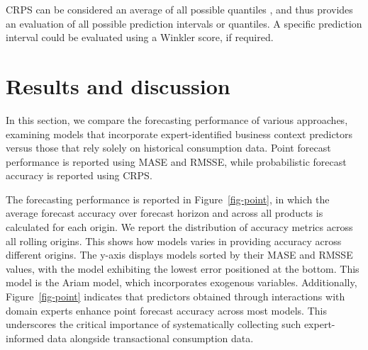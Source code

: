 \documentclass[
  authoryear,
  preprint,
  3p]{elsarticle}
\begin{document}
CRPS can be considered an average of all possible quantiles
\citep[Section 5.9]{hyndman2021forecasting}, and thus provides an
evaluation of all possible prediction intervals or quantiles. A specific
prediction interval could be evaluated using a Winkler score, if
required.

\section{Results and discussion}\label{sec-results}

In this section, we compare the forecasting performance of various
approaches, examining models that incorporate expert-identified business
context predictors versus those that rely solely on historical
consumption data. Point forecast performance is reported using MASE and
RMSSE, while probabilistic forecast accuracy is reported using CRPS.

The forecasting performance is reported in Figure~\ref{fig-point}, in
which the average forecast accuracy over forecast horizon and across all
products is calculated for each origin. We report the distribution of
accuracy metrics across all rolling origins. This shows how models
varies in providing accuracy across different origins. The y-axis
displays models sorted by their MASE and RMSSE values, with the model
exhibiting the lowest error positioned at the bottom. This model is the
Ariam model, which incorporates exogenous variables. Additionally,
Figure~\ref{fig-point} indicates that predictors obtained through
interactions with domain experts enhance point forecast accuracy across
most models. This underscores the critical importance of systematically
collecting such expert-informed data alongside transactional consumption
data.
\end{document}
